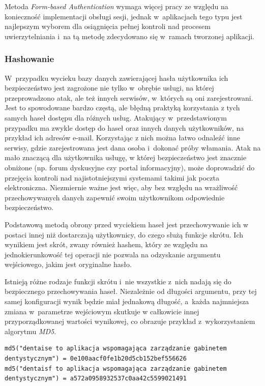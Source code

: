 \documentclass[11pt]{aghdpl}
\begin{document}
Metoda \emph{Form-based Authentication} wymaga więcej pracy ze względu na konieczność implementacji obsługi sesji, jednak w~aplikacjach tego typu jest najlepszym wyborem dla osiągnięcia pełnej kontroli nad procesem uwierzytelniania i~na tą metodę zdecydowano się w~ramach tworzonej aplikacji.

\subsubsection{Hashowanie}
\label{sec:hashowanie}

W~przypadku wycieku bazy danych zawierającej hasła użytkownika ich bezpieczeństwo jest zagrożone nie tylko w~obrębie usługi, na której przeprowadzono atak, ale też innych serwisów, w~których są oni zarejestrowani. Jest to spowodowane bardzo częstą, ale błędną praktyką korzystania z tych samych haseł dostępu dla różnych usług. Atakujący w~przedstawionym przypadku ma zwykle dostęp do haseł oraz innych danych użytkowników, na przykład ich adresów e-mail. Korzystając z nich można łatwo odnaleźć inne serwisy, gdzie zarejestrowana jest dana osoba i~dokonać próby włamania. Atak na mało znaczącą dla użytkownika usługę, w której bezpieczeństwo jest znacznie obniżone (np. forum dyskusyjne czy portal informacyjny), może doprowadzić do przejęcia kontroli nad najistotniejszymi systemami takimi jak poczta elektroniczna. Niezmiernie ważne jest więc, aby bez względu na wrażliwość przechowywanych danych zapewnić swoim użytkownikom odpowiednie bezpieczeństwo.

Podstawową metodą obrony przed wyciekiem haseł jest przechowywanie ich w postaci innej niż dostarczają użytkownicy, do czego służą funkcje skrótu. Ich wynikiem jest skrót, zwany również hashem, który ze względu na jednokierunkowość tej operacji nie pozwala na odzyskanie argumentu wejściowego, jakim jest oryginalne hasło.

Istnieją różne rodzaje funkcji skrótu i~nie wszystkie z~nich nadają się do bezpiecznego przechowywania haseł. Niezależnie od długości argumentu, przy tej samej konfiguracji wynik będzie miał jednakową długość, a~każda najmniejsza zmiana w~parametrze wejściowym skutkuje w całkowicie innej przyporządkowanej wartości wynikowej, co obrazuje przykład z~wykorzystaniem algorytmu \emph{MD5}.

\begin{lstlisting}
md5("dentaise to aplikacja wspomagająca zarządzanie gabinetem dentystycznym") = 0e100aacf0fe1b20d5cb152bef556626
md5("dentaisf to aplikacja wspomagająca zarządzanie gabinetem dentystycznym") = a572a0958932537c0aa42c5599021491
\end{lstlisting}
\end{document}
